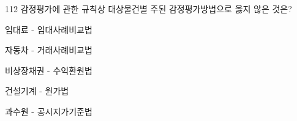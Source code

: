 \begin{question}{112}
감정평가에 관한 규칙상 대상물건별 주된 감정평가방법으로 옳지 않은 것은?
\begin{choices}
  \item 임대료 - 임대사례비교법
  \item 자동차 - 거래사례비교법
  \item 비상장채권 - 수익환원법
  \item 건설기계 - 원가법
  \item 과수원 - 공시지가기준법
\end{choices}
\end{question}
